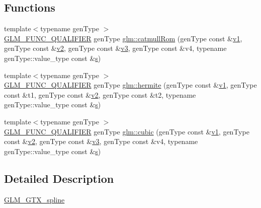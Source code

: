 \subsection*{Functions}
\begin{DoxyCompactItemize}
\item 
{\footnotesize template$<$typename gen\+Type $>$ }\\\mbox{\hyperlink{setup_8hpp_a33fdea6f91c5f834105f7415e2a64407}{G\+L\+M\+\_\+\+F\+U\+N\+C\+\_\+\+Q\+U\+A\+L\+I\+F\+I\+ER}} gen\+Type \mbox{\hyperlink{group__gtx__spline_ga8119c04f8210fd0d292757565cd6918d}{glm\+::catmull\+Rom}} (gen\+Type const \&\mbox{\hyperlink{glad_8h_a0779c3b73f9aa3a0ac5b0139b5d291d9}{v1}}, gen\+Type const \&\mbox{\hyperlink{glad_8h_a9a09a1837922b2b806f4589096a52049}{v2}}, gen\+Type const \&\mbox{\hyperlink{glad_8h_acc806b31cbf466ceba6555983d8b814d}{v3}}, gen\+Type const \&v4, typename gen\+Type\+::value\+\_\+type const \&\mbox{\hyperlink{glad_8h_af1b1d5edfea6a34daee7389b1b5810ad}{s}})
\item 
{\footnotesize template$<$typename gen\+Type $>$ }\\\mbox{\hyperlink{setup_8hpp_a33fdea6f91c5f834105f7415e2a64407}{G\+L\+M\+\_\+\+F\+U\+N\+C\+\_\+\+Q\+U\+A\+L\+I\+F\+I\+ER}} gen\+Type \mbox{\hyperlink{group__gtx__spline_gaa69e143f6374d32f934a8edeaa50bac9}{glm\+::hermite}} (gen\+Type const \&\mbox{\hyperlink{glad_8h_a0779c3b73f9aa3a0ac5b0139b5d291d9}{v1}}, gen\+Type const \&t1, gen\+Type const \&\mbox{\hyperlink{glad_8h_a9a09a1837922b2b806f4589096a52049}{v2}}, gen\+Type const \&t2, typename gen\+Type\+::value\+\_\+type const \&\mbox{\hyperlink{glad_8h_af1b1d5edfea6a34daee7389b1b5810ad}{s}})
\item 
{\footnotesize template$<$typename gen\+Type $>$ }\\\mbox{\hyperlink{setup_8hpp_a33fdea6f91c5f834105f7415e2a64407}{G\+L\+M\+\_\+\+F\+U\+N\+C\+\_\+\+Q\+U\+A\+L\+I\+F\+I\+ER}} gen\+Type \mbox{\hyperlink{group__gtx__spline_ga6b867eb52e2fc933d2e0bf26aabc9a70}{glm\+::cubic}} (gen\+Type const \&\mbox{\hyperlink{glad_8h_a0779c3b73f9aa3a0ac5b0139b5d291d9}{v1}}, gen\+Type const \&\mbox{\hyperlink{glad_8h_a9a09a1837922b2b806f4589096a52049}{v2}}, gen\+Type const \&\mbox{\hyperlink{glad_8h_acc806b31cbf466ceba6555983d8b814d}{v3}}, gen\+Type const \&v4, typename gen\+Type\+::value\+\_\+type const \&\mbox{\hyperlink{glad_8h_af1b1d5edfea6a34daee7389b1b5810ad}{s}})
\end{DoxyCompactItemize}


\subsection{Detailed Description}
\mbox{\hyperlink{group__gtx__spline}{G\+L\+M\+\_\+\+G\+T\+X\+\_\+spline}} 